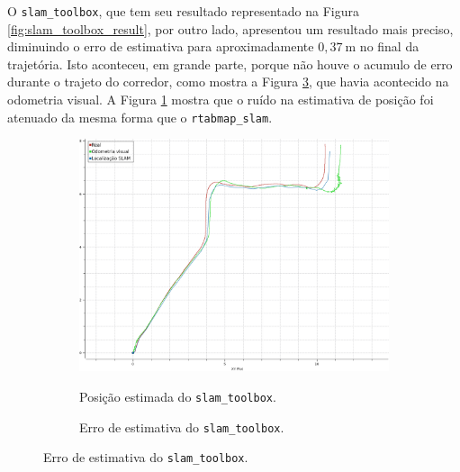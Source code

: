 \documentclass[repeatfields,xlists,xpacks,oneside,yearsonly]{ufrgscca}
\begin{document}
O \texttt{slam\_toolbox}, que tem seu resultado representado na
Figura \ref{fig:slam_toolbox_result}, por outro lado, apresentou um
resultado mais preciso, diminuindo o erro de estimativa para
aproximadamente $0,37~\si{\meter}$ no final da trajetória. Isto
aconteceu, em grande parte, porque não houve o acumulo de erro
durante o trajeto do corredor, como mostra a Figura
\ref{fig:localization_slam_toolbox_error}, que havia acontecido na
odometria visual. A Figura \ref{fig:localization_slam_toolbox} mostra
que o ruído na estimativa de posição foi atenuado da mesma forma que
o \texttt{rtabmap\_slam}.

\begin{figure}[h]
    \caption{Resultado do pacote \texttt{slam\_toolbox}.}
    \label{fig:slam_toolbox_result}
    \begin{subfigure}{0.5\linewidth}
        {
            \centering
            \caption{Posição estimada do \texttt{slam\_toolbox}.}
            \label{fig:localization_slam_toolbox}
            \includegraphics[width=0.98\linewidth]{localization-slam-toolbox.png}\\
        }
    \end{subfigure}
    \begin{subfigure}{0.5\linewidth}
        {
            \centering
            \caption{Erro de estimativa do \texttt{slam\_toolbox}.}
            \label{fig:localization_slam_toolbox_error}
}
\end{subfigure}
\end{figure}
\end{document}
